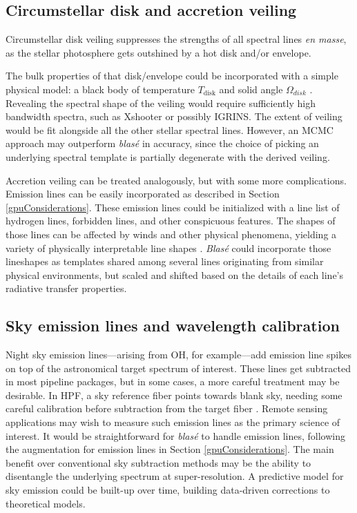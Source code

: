 \documentclass[twocolumn]{aastex631}
\begin{document}
\subsection{Circumstellar disk and accretion veiling}
Circumstellar disk veiling suppresses the strengths of all spectral lines \emph{en masse}, as the stellar photosphere gets outshined by a hot disk and/or envelope.

The bulk properties of that disk/envelope could be incorporated with a simple physical model: a black body of temperature $T_\mathrm{disk}$ and solid angle $\Omega_{disk}$ \citep{2018ApJ...862...85G}.  Revealing the spectral shape of the veiling would require sufficiently high bandwidth spectra, such as Xshooter \citep{2011A&A...536A.105V} or possibly IGRINS.  The extent of veiling would be fit alongside all the other stellar spectral lines.  However, an MCMC approach may outperform  \emph{blas\'e} in accuracy, since the choice of picking an underlying spectral template is partially degenerate with the derived veiling.

Accretion veiling can be treated analogously, but with some more complications.  Emission lines can be easily incorporated as described in Section \ref{gpuConsiderations}.
These emission lines could be initialized with a line list of hydrogen lines, forbidden lines, and other conspicuous features.  The shapes of those lines can be affected by winds and other physical phenomena, yielding a variety of physically interpretable line shapes \citep{2022arXiv220802940E}.   \emph{Blas\'e} could incorporate those lineshapes as templates shared among several lines originating from similar physical environments, but scaled and shifted based on the details of each line's radiative transfer properties.

\subsection{Sky emission lines and wavelength calibration}
Night sky emission lines---arising from OH, for example---add emission line spikes on top of the astronomical target spectrum of interest.  These lines get subtracted in most pipeline packages, but in some cases, a more careful treatment may be desirable.  In HPF, a sky reference fiber points towards blank sky, needing some careful calibration before subtraction from the target fiber \citep{2022JOSS....7.4302G}.  Remote sensing applications may wish to measure such emission lines as the primary science of interest.  It would be straightforward for \emph{blas\'e} to handle emission lines, following the augmentation for emission lines in Section \ref{gpuConsiderations}.  The main benefit over conventional sky subtraction methods may be the ability to disentangle the underlying spectrum at super-resolution.  A predictive model for sky emission could be built-up over time, building data-driven corrections to theoretical models.
\end{document}
